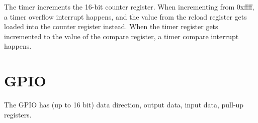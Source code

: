 \documentclass{book}
\begin{document}
The timer increments the 16-bit counter register. When incrementing from 0xffff, a timer overflow interrupt happens, and the value from the reload register gets loaded into the counter register instead. When the timer register gets incremented to the value of the compare register, a timer compare interrupt happens.

\section{GPIO}

The GPIO has (up to 16 bit) data direction, output data, input data, pull-up registers.
\end{document}

